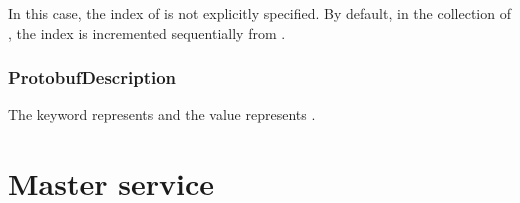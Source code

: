 \begin{content}
In this case, the index of  is not explicitly specified. By default, in the  collection of , the  index is incremented sequentially from .

\subsubsection{ProtobufDescription}


The  keyword represents  and the value represents .

\end{content}

\section{Master service}

